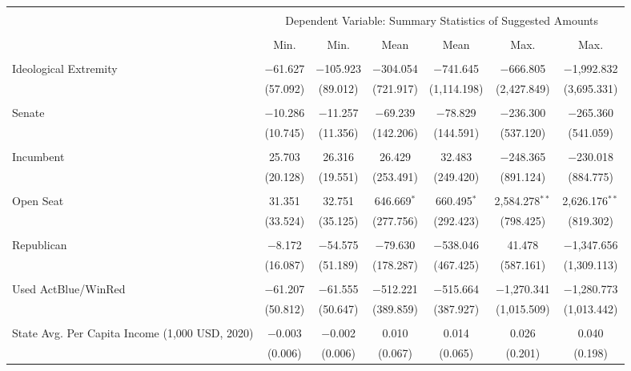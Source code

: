 
\begin{tabular}{@{\extracolsep{5pt}}lcccccc} 
\\[-1.8ex]\hline 
\hline \\[-1.8ex] 
 & \multicolumn{6}{c}{Dependent Variable: Summary Statistics of Suggested Amounts} \\ 
\cline{2-7} 
\\[-1.8ex] & Min. & Min. & Mean & Mean & Max. & Max. \\ 
\hline \\[-1.8ex] 
 Ideological Extremity & $-$61.627 & $-$105.923 & $-$304.054 & $-$741.645 & $-$666.805 & $-$1,992.832 \\ 
  & (57.092) & (89.012) & (721.917) & (1,114.198) & (2,427.849) & (3,695.331) \\ 
  & & & & & & \\ 
 Senate & $-$10.286 & $-$11.257 & $-$69.239 & $-$78.829 & $-$236.300 & $-$265.360 \\ 
  & (10.745) & (11.356) & (142.206) & (144.591) & (537.120) & (541.059) \\ 
  & & & & & & \\ 
 Incumbent & 25.703 & 26.316 & 26.429 & 32.483 & $-$248.365 & $-$230.018 \\ 
  & (20.128) & (19.551) & (253.491) & (249.420) & (891.124) & (884.775) \\ 
  & & & & & & \\ 
 Open Seat & 31.351 & 32.751 & 646.669$^{*}$ & 660.495$^{*}$ & 2,584.278$^{**}$ & 2,626.176$^{**}$ \\ 
  & (33.524) & (35.125) & (277.756) & (292.423) & (798.425) & (819.302) \\ 
  & & & & & & \\ 
 Republican & $-$8.172 & $-$54.575 & $-$79.630 & $-$538.046 & 41.478 & $-$1,347.656 \\ 
  & (16.087) & (51.189) & (178.287) & (467.425) & (587.161) & (1,309.113) \\ 
  & & & & & & \\ 
 Used ActBlue/WinRed & $-$61.207 & $-$61.555 & $-$512.221 & $-$515.664 & $-$1,270.341 & $-$1,280.773 \\ 
  & (50.812) & (50.647) & (389.859) & (387.927) & (1,015.509) & (1,013.442) \\ 
  & & & & & & \\ 
 State Avg. Per Capita Income (1,000 USD, 2020) & $-$0.003 & $-$0.002 & 0.010 & 0.014 & 0.026 & 0.040 \\ 
  & (0.006) & (0.006) & (0.067) & (0.065) & (0.201) & (0.198) \\ 

\end{tabular}
